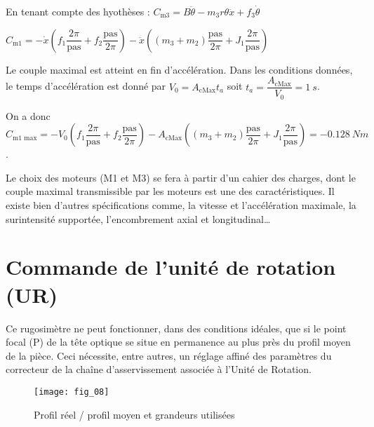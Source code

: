 \ifprof
\begin{corrige}
En tenant compte des hyothèses : 
$ C_{\text{m3}} = B\ddot{\theta}  - m_3 r\theta \ddot{x} + f_3 \dot{\theta}   $

 $C_{\text{m1}} 
  =
   - \dot{x}\left( f_1\dfrac{2\pi}{\text{pas}} +f_2  \dfrac{\text{pas}}{2\pi}\right)
- \ddot{x}\left( \left( m_3+m_2 \right)\dfrac{\text{pas}}{2\pi}+ J_1 \dfrac{2\pi}{\text{pas}} \right)
$


Le couple maximal est atteint en fin d'accélération. Dans les conditions données, le temps d'accélération est donné par 
$V_0 = A_{\text{cMax}} t_a$ soit $ t_a  = \dfrac{A_{\text{cMax}}}{V_0} = \SI{1}{s}$.

On a donc 
 $C_{\text{m1 max}} 
  =
   - V_0\left( f_1\dfrac{2\pi}{\text{pas}} +f_2  \dfrac{\text{pas}}{2\pi}\right)
-  A_{\text{cMax}}\left( \left( m_3+m_2 \right)\dfrac{\text{pas}}{2\pi}+ J_1 \dfrac{2\pi}{\text{pas}} \right) = -\SI{0,128}{Nm}$.

\end{corrige}
\else
\fi

\ifprof
\else
Le choix des moteurs (M1 et M3) se fera à partir d’un cahier des charges, dont le couple maximal
transmissible par les moteurs est une des caractéristiques. Il existe bien d’autres spécifications comme, la
vitesse et l’accélération maximale, la surintensité supportée, l’encombrement axial et longitudinal…
\fi

\section{Commande de l'unité de rotation (UR)}
\ifprof
\else
Ce rugosimètre ne peut fonctionner, dans des conditions idéales, que si le point focal (P) de la tête optique
se situe en permanence au plus près du profil moyen de la pièce. Ceci nécessite, entre autres, un réglage
affiné des paramètres du correcteur de la chaîne d’asservissement associée à l’Unité de Rotation.

\begin{figure}[H]
\centering
\texttt{[image: fig\_08]}
\caption{\label{fig_08} Profil réel / profil moyen et grandeurs utilisées}
\end{figure}

